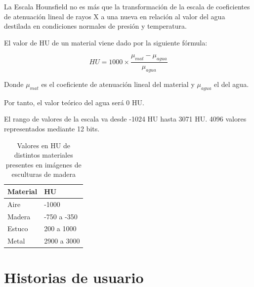 La Escala Hounsfield no es más que la transformación de la escala de coeficientes de atenuación lineal de rayos X a una nueva en relación al valor del agua destilada en condiciones normales de presión y temperatura.

El valor de HU de un material viene dado por la siguiente fórmula:

\[ HU = 1000 \times \frac{\mu_{mat}-\mu_{agua}}{\mu_{agua}} \]

Donde $ \mu_{mat} $ es el coeficiente de atenuación lineal del material y $ \mu_{agua} $ el del agua.

Por tanto, el valor teórico del agua será 0 HU.

El rango de valores de la escala va desde -1024 HU hasta 3071 HU. 4096 valores representados mediante 12 bits.

\begin{table}[H]
	\begin{center}
		\begin{tabular} {|l|l|}
			\hline
			Material & HU \\ \hline
			\hline
			Aire & -1000 \\ \hline
			Madera & -750 a -350 \\ \hline
			Estuco & 200 a 1000 \\ \hline
			Metal & 2900 a 3000 \\ \hline
		\end{tabular}
		\caption{Valores en HU de distintos materiales presentes en imágenes de esculturas de madera}
		\label{tab:materials_hu}
	\end{center}
\end{table}

\section{Historias de usuario}


